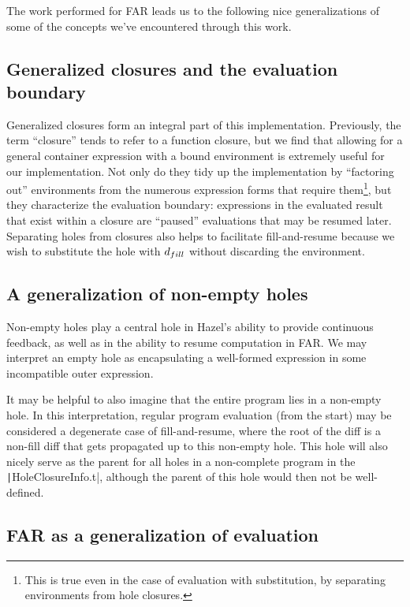 The work performed for FAR leads us to the following nice generalizations of some of the concepts we've encountered through this work.

\subsection{Generalized closures and the evaluation boundary}
\label{sec:generalized-closures}

Generalized closures form an integral part of this implementation. Previously, the term ``closure'' tends to refer to a function closure, but we find that allowing for a general container expression with a bound environment is extremely useful for our implementation. Not only do they tidy up the implementation by ``factoring out'' environments from the numerous expression forms that require them\footnote{This is true even in the case of evaluation with substitution, by separating environments from hole closures.}, but they characterize the evaluation boundary: expressions in the evaluated result that exist within a closure are ``paused'' evaluations that may be resumed later. Separating holes from closures also helps to facilitate fill-and-resume because we wish to substitute the hole with $d_{fill}$ without discarding the environment.

\subsection{A generalization of non-empty holes}
\label{sec:generalized-neholes}

Non-empty holes play a central hole in Hazel's ability to provide continuous feedback, as well as in the ability to resume computation in FAR. We may interpret an empty hole as encapsulating a well-formed expression in some incompatible outer expression.

It may be helpful to also imagine that the entire program lies in a non-empty hole. In this interpretation, regular program evaluation (from the start) may be considered a degenerate case of fill-and-resume, where the root of the diff is a non-fill diff that gets propagated up to this non-empty hole. This hole will also nicely serve as the parent for all holes in a non-complete program in the \texttt|HoleClosureInfo.t|, although the parent of this hole would then not be well-defined.

\subsection{FAR as a generalization of evaluation}
\label{sec:generalized-far}

